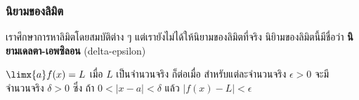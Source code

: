 \begin{frame}
\frametitle{นิยามของลิมิต}
เราศึกษาการหาลิมิตโดยสมบัติต่าง ๆ แต่เรายังไม่ได้ให้นิยามของลิมิตที่จริง นิยิามของลิมิตนี้มีชื่อว่า \textbf{นิยามเดลตา-เอพซิลอน} (delta-epsilon)
\begin{defn}{}{}
$\limx{a} f(x) = L$ เมื่อ $L$ เป็นจำนวนจริง ก็ต่อเมื่อ สำหรับแต่ละจำนวนจริง $\epsilon > 0$ จะมีจำนวนจริง $\delta > 0$ ซึ่ง ถ้า $0 < |x-a| < \delta$ แล้ว  $|f(x) - L| < \epsilon$
\end{defn}
\end{frame}

